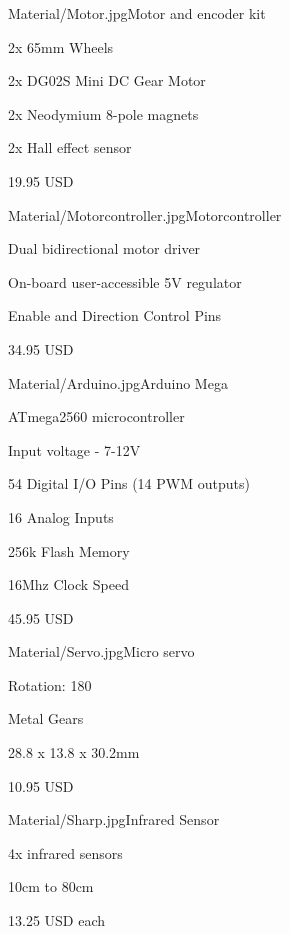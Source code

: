 \begin{material}{Material/Motor.jpg}{Motor and encoder kit}
\item 2x 65mm Wheels
\item 2x DG02S Mini DC Gear Motor
\item 2x Neodymium 8-pole magnets
\item 2x Hall effect sensor
\item 19.95 USD
\end{material}

\begin{material}{Material/Motorcontroller.jpg}{Motorcontroller}
\item Dual bidirectional motor driver
\item On-board user-accessible 5V regulator 
\item Enable and Direction Control Pins
\item 34.95 USD
\end{material}

\begin{material}{Material/Arduino.jpg}{Arduino Mega}
\item ATmega2560 microcontroller
\item Input voltage - 7-12V
\item 54 Digital I/O Pins (14 PWM outputs)
\item 16 Analog Inputs
\item 256k Flash Memory
\item 16Mhz Clock Speed
\item 45.95 USD
\end{material}

\begin{material}{Material/Servo.jpg}{Micro servo}
\item Rotation: 180\degree
\item Metal Gears
\item 28.8 x 13.8 x 30.2mm
\item 10.95 USD
\end{material}

\newpage
{}
\begin{material}{Material/Sharp.jpg}{Infrared Sensor}
\item 4x infrared sensors
\item 10cm to 80cm
\item 13.25 USD each
\end{material}


